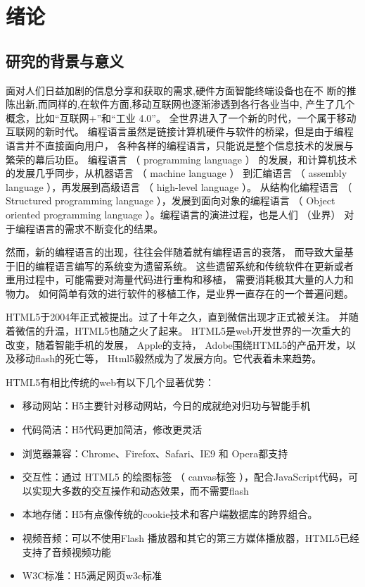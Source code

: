 \chapter{绪论}

\section{研究的背景与意义}

面对人们日益加剧的信息分享和获取的需求,硬件方面智能终端设备也在不
断的推陈出新,而同样的,在软件方面,移动互联网也逐渐渗透到各行各业当中, 
产生了几个概念，比如“互联网+”和“工业 4.0”。
全世界进入了一个新的时代，一个属于移动互联网的新时代。
编程语言虽然是链接计算机硬件与软件的桥梁，但是由于编程语言并不直接面向用户，
各种各样的编程语言，只能说是整个信息技术的发展与繁荣的幕后功臣。
编程语言 （ programming language ） 的发展，和计算机技术的发展几乎同步，从机器语言 （ machine language ） 到汇编语言 （ assembly language ），再发展到高级语言 （ high-level language ）。
从结构化编程语言 （ Structured programming language ），发展到面向对象的编程语言 （ Object oriented programming language ）。编程语言的演进过程，也是人们 （业界） 对于编程语言的需求不断变化的结果。

然而，新的编程语言的出现，往往会伴随着就有编程语言的衰落，
而导致大量基于旧的编程语言编写的系统变为遗留系统。
这些遗留系统和传统软件在更新或者重用过程中，可能需要对海量代码进行重构和移植，
需要消耗极其大量的人力和物力。
如何简单有效的进行软件的移植工作，是业界一直存在的一个普遍问题。

HTML5于2004年正式被提出。过了十年之久，直到微信出现才正式被关注。
并随着微信的升温，HTML5也随之火了起来。
HTML5是web开发世界的一次重大的改变，随着智能手机的发展， 
Apple的支持， Adobe围绕HTML5的产品开发，以及移动flash的死亡等，
Html5毅然成为了发展方向。它代表着未来趋势。

HTML5有相比传统的web有以下几个显著优势：

\begin{itemize}
    \item {\heiti 移动网站：}H5主要针对移动网站，今日的成就绝对归功与智能手机
    \item {\heiti 代码简洁：}H5代码更加简洁，修改更灵活
    \item {\heiti 浏览器兼容：}Chrome、Firefox、Safari、IE9 和 Opera都支持 
    \item {\heiti 交互性：}通过 HTML5 的绘图标签 （ canvas标签 ），配合JavaScript代码，可以实现大多数的交互操作和动态效果，而不需要flash
    \item {\heiti 本地存储：}H5有点像传统的cookie技术和客户端数据库的跨界组合。
    \item {\heiti 视频音频：}可以不使用Flash 播放器和其它的第三方媒体播放器，HTML5已经支持了音频视频功能
    \item {\heiti W3C标准：}H5满足网页w3c标准
\end{itemize}


